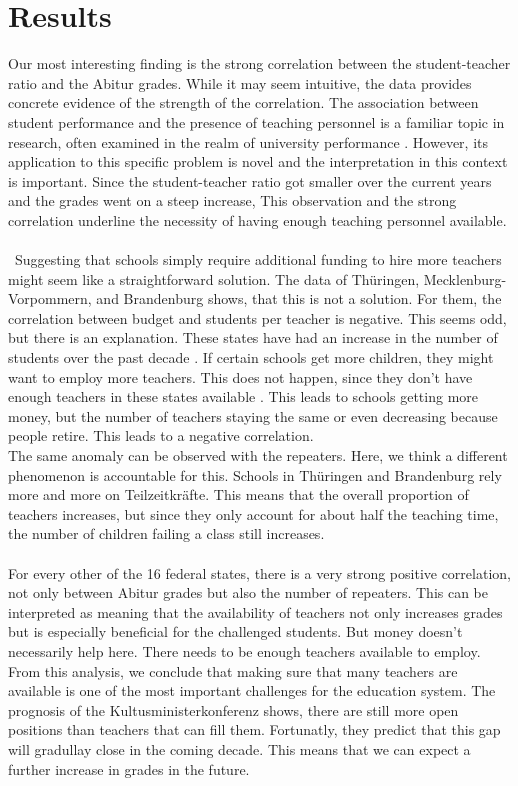 \section*{Results}
Our most interesting finding is the strong correlation between the student-teacher ratio and the Abitur grades. 
While it may seem intuitive, the data provides concrete evidence of the strength of the correlation. 
The association between student performance and the presence of teaching personnel is a familiar topic in research, often examined in the realm of university performance \cite{doi:10.1080/00220485.1984.10845072}. However, its application to this specific problem is novel and the interpretation in this context is important. Since the student-teacher ratio got smaller over the current years and the grades went on a steep increase, This observation and the strong correlation underline the necessity of having enough teaching personnel available.\\\\\
Suggesting that schools simply require additional funding to hire more teachers might seem like a straightforward solution. The data of Thüringen, Mecklenburg-Vorpommern, and Brandenburg shows, that this is not a solution. For them, the correlation between budget and students per teacher is negative. This seems odd, but there is an explanation. These states have had an increase in the number of students over the past decade \cite{Brandenburg}\cite{Sachsen} \cite{Mecklenburg}. If certain schools get more children, they might want to employ more teachers. This does not happen, since they don't have enough teachers in these states available \cite{Kultusministerkonferenz}. This leads to schools getting more money, but the number of teachers staying the same or even decreasing because people retire. This leads to a negative correlation.\\
The same anomaly can be observed with the repeaters. Here, we think a different phenomenon is accountable for this. Schools in Thüringen and Brandenburg rely more and more on Teilzeitkräfte. This means that the overall proportion of teachers increases, but since they only account for about half the teaching time, the number of children failing a class still increases. \\\\
For every other of the 16 federal states, there is a very strong positive correlation, not only between Abitur grades but also the number of repeaters. This can be interpreted as meaning that the availability of teachers not only increases grades but is especially beneficial for the challenged students. But money doesn't necessarily help here. There needs to be enough teachers available to employ. From this analysis, we conclude that making sure that many teachers are available is one of the most important challenges for the education system. The prognosis of the Kultusministerkonferenz \cite{Kultusministerkonferenz} shows, there are still more open positions than teachers that can fill them. Fortunatly, they predict that this gap will gradullay close in the coming decade.  This means that we can expect a further increase in grades in the future. \\\\
